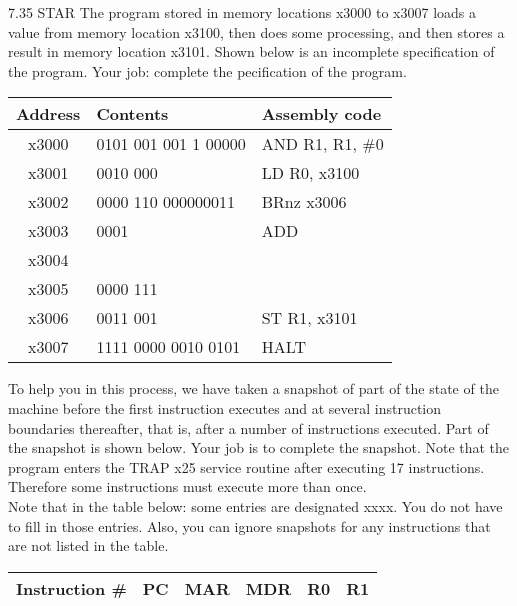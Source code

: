 \documentclass{patt}
\begin{document}
\begin{exercises}
\item[7.35]STAR The program stored in memory locations x3000 to x3007 loads a value from memory location x3100, then does some processing, and then stores a result in memory location x3101.  Shown below is an incomplete specification of the program.  Your job: complete the pecification of the program.

\begin{center}
\begin{tabular}{|c|m{5cm}|m{4cm}|}
\hline
Address & Contents & Assembly code\\ \hline

x3000 & 0101 001 001 1 00000 & AND R1, R1, \#0 \\ \hline

x3001 & 0010 000  & LD R0, x3100 \\ \hline

x3002 & 0000 110 000000011 & BRnz x3006 \\ \hline

x3003 & 0001  & ADD  \\ \hline

x3004 &  &  \\ \hline

x3005 & 0000 111  &  \\ \hline

x3006 & 0011 001  & ST R1, x3101 \\ \hline

x3007 & 1111 0000 0010 0101 & HALT \\ \hline

\end{tabular}
\end{center}

\noindent
To help you in this process, we have taken a snapshot of part of the state of the machine before the first instruction executes and at several instruction boundaries thereafter, that is, after a number of instructions executed. Part of the snapshot is shown below. Your job is to complete the snapshot. Note that the program enters the TRAP x25 service routine after executing 17 instructions. Therefore some instructions must execute more than once.\\

\vspace{0.1in}
\noindent
Note that in the table below: some entries are designated xxxx. You do not
have to fill in those entries.  Also, you can ignore snapshots for any
instructions that are not listed in the table.
\begin{center}
\begin{tabular}{|c|c|m{1.5cm}|m{1.5cm}|m{1.5cm}|m{1.5cm}|}
\hline
Instruction \# &PC& MAR& MDR& R0& R1 \\ \hline


\end{tabular}
\end{center}
\end{exercises}
\end{document}
